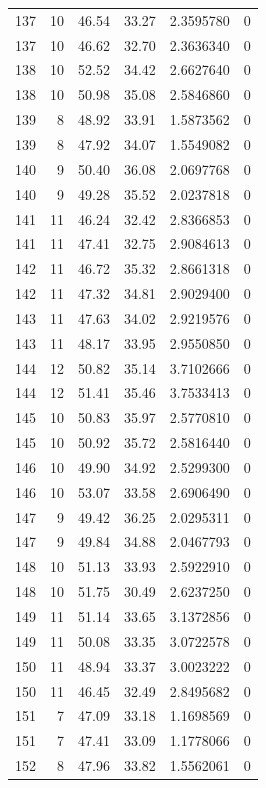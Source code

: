 \documentclass[
  letterpaper,
  DIV=11,
  numbers=noendperiod]{scrreprt}
\renewcommand{\[}{\begin{equation}}
\renewcommand{\]}{\end{equation}}
\begin{document}
\begin{table}
\begin{tabular*}{\linewidth}{@{\extracolsep{\fill}}rrrrrr}
137 & 10 & 46.54 & 33.27 & 2.3595780 & 0 \\ 
137 & 10 & 46.62 & 32.70 & 2.3636340 & 0 \\ 
138 & 10 & 52.52 & 34.42 & 2.6627640 & 0 \\ 
138 & 10 & 50.98 & 35.08 & 2.5846860 & 0 \\ 
139 & 8 & 48.92 & 33.91 & 1.5873562 & 0 \\ 
139 & 8 & 47.92 & 34.07 & 1.5549082 & 0 \\ 
140 & 9 & 50.40 & 36.08 & 2.0697768 & 0 \\ 
140 & 9 & 49.28 & 35.52 & 2.0237818 & 0 \\ 
141 & 11 & 46.24 & 32.42 & 2.8366853 & 0 \\ 
141 & 11 & 47.41 & 32.75 & 2.9084613 & 0 \\ 
142 & 11 & 46.72 & 35.32 & 2.8661318 & 0 \\ 
142 & 11 & 47.32 & 34.81 & 2.9029400 & 0 \\ 
143 & 11 & 47.63 & 34.02 & 2.9219576 & 0 \\ 
143 & 11 & 48.17 & 33.95 & 2.9550850 & 0 \\ 
144 & 12 & 50.82 & 35.14 & 3.7102666 & 0 \\ 
144 & 12 & 51.41 & 35.46 & 3.7533413 & 0 \\ 
145 & 10 & 50.83 & 35.97 & 2.5770810 & 0 \\ 
145 & 10 & 50.92 & 35.72 & 2.5816440 & 0 \\ 
146 & 10 & 49.90 & 34.92 & 2.5299300 & 0 \\ 
146 & 10 & 53.07 & 33.58 & 2.6906490 & 0 \\ 
147 & 9 & 49.42 & 36.25 & 2.0295311 & 0 \\ 
147 & 9 & 49.84 & 34.88 & 2.0467793 & 0 \\ 
148 & 10 & 51.13 & 33.93 & 2.5922910 & 0 \\ 
148 & 10 & 51.75 & 30.49 & 2.6237250 & 0 \\ 
149 & 11 & 51.14 & 33.65 & 3.1372856 & 0 \\ 
149 & 11 & 50.08 & 33.35 & 3.0722578 & 0 \\ 
150 & 11 & 48.94 & 33.37 & 3.0023222 & 0 \\ 
150 & 11 & 46.45 & 32.49 & 2.8495682 & 0 \\ 
151 & 7 & 47.09 & 33.18 & 1.1698569 & 0 \\ 
151 & 7 & 47.41 & 33.09 & 1.1778066 & 0 \\ 
152 & 8 & 47.96 & 33.82 & 1.5562061 & 0 \\ 

\end{tabular*}
\end{table}
\end{document}
